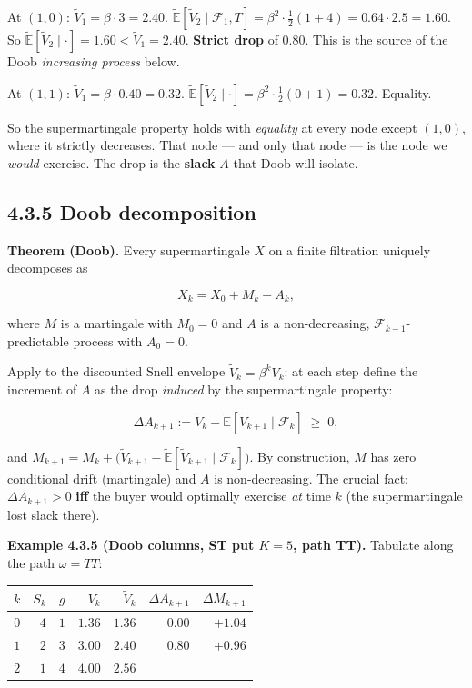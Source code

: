 \documentclass[
  10pt,
  twoside]{book}
\newcounter{none} %
\begin{document}
At \((1, 0)\): \(\tilde V_1 = \beta\cdot 3 = 2.40\).
\(\tilde{\mathbb{E}}[\tilde V_2\mid\mathcal F_1, T] = \beta^2\cdot \tfrac{1}{2}(1 + 4) = 0.64\cdot 2.5 = 1.60\).
So
\(\tilde{\mathbb{E}}[\tilde V_2\mid \cdot] = 1.60 < \tilde V_1 = 2.40\).
\textbf{Strict drop} of \(0.80\). This is the source of the Doob
\emph{increasing process} below.

At \((1, 1)\): \(\tilde V_1 = \beta\cdot 0.40 = 0.32\).
\(\tilde{\mathbb{E}}[\tilde V_2 \mid \cdot] = \beta^2\cdot\tfrac{1}{2}(0 + 1) = 0.32\).
Equality.

So the supermartingale property holds with \emph{equality} at every node
except \((1, 0)\), where it strictly decreases. That node --- and only
that node --- is the node we \emph{would} exercise. The drop is the
\textbf{slack} \(A\) that Doob will isolate.

\subsection{4.3.5 Doob decomposition}\label{doob-decomposition}

\textbf{Theorem (Doob).} Every supermartingale \(X\) on a finite
filtration uniquely decomposes as

\[X_k = X_0 + M_k - A_k,\]

where \(M\) is a martingale with \(M_0 = 0\) and \(A\) is a
non-decreasing, \(\mathcal F_{k-1}\)-predictable process with
\(A_0 = 0\).

Apply to the discounted Snell envelope \(\tilde V_k = \beta^k V_k\): at
each step define the increment of \(A\) as the drop \emph{induced} by
the supermartingale property:

\[\Delta A_{k+1} := \tilde V_k - \tilde{\mathbb{E}}[\tilde V_{k+1}\mid\mathcal F_k] \;\ge\; 0,\]

and
\(M_{k+1} = M_k + \big(\tilde V_{k+1} - \tilde{\mathbb{E}}[\tilde V_{k+1}\mid\mathcal F_k]\big)\).
By construction, \(M\) has zero conditional drift (martingale) and \(A\)
is non-decreasing. The crucial fact: \(\Delta A_{k+1} > 0\) \textbf{iff}
the buyer would optimally exercise \emph{at} time \(k\) (the
supermartingale lost slack there).

\textbf{Example 4.3.5 (Doob columns, ST put \(K = 5\), path TT).}
Tabulate along the path \(\omega = TT\):

{\def\LTcaptype{none} %
\begin{table}[H]
\centering
\begin{tabular}{|c|r|r|r|r|r|r|}
\toprule
\(k\) & \(S_k\) & \(g\) & \(V_k\) & \(\tilde V_k\) & \(\Delta A_{k+1}\) & \(\Delta M_{k+1}\) \\
\midrule



\(0\) & \(4\) & \(1\) & \(1.36\) & \(1.36\) & \(0.00\) & \(+1.04\) \\
\(1\) & \(2\) & \(3\) & \(3.00\) & \(2.40\) & \(0.80\) & \(+0.96\) \\
\(2\) & \(1\) & \(4\) & \(4.00\) & \(2.56\) & & \\
\bottomrule
\end{tabular}
\end{table}
}
\end{document}
